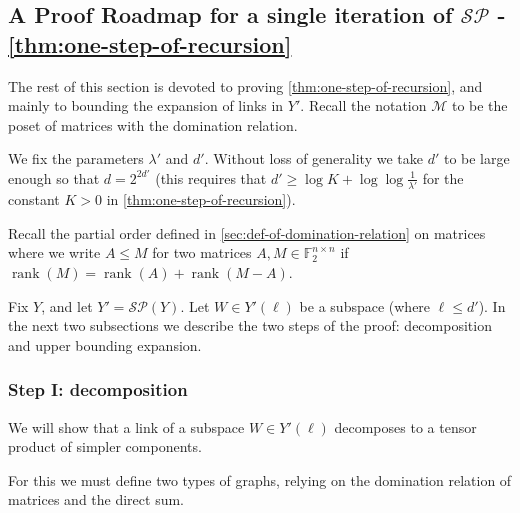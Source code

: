 \documentclass[10pt,a4paper]{article}
\newcommand{\prettyref}[1]{\cref{#1}}
\theoremstyle{definition}
\theoremstyle{remark}
\newcommand{\Authornotecolored}[3]{{\sffamily\small\color{#1}{[#2: #3]}}}
\newcommand{\Authornotecolored}[3]{}
\newcommand{\Ynote}{\Authornotecolored{Purple}{Y}}
\newcommand{\Snote}{\Authornotecolored{Green}{S}}
\newcommand{\snote}{\Snote}
\newcommand{\F}{\mathbb{F}}
\DeclareMathOperator{\rank}{rank}
\renewcommand{\leq}{\leqslant}
\renewcommand{\geq}{\geqslant}
\numberwithin{equation}{section}
\let\pref=\prettyref
\def\Y{Y}
\def\diml{d}
\def\dimlin{{\diml}}
\def\dimlout{\diml'}
\def\lambdao{\lambda'}
\def\dimm{\ell}
\def\M{\mathcal{SP}}
\def\MP{\mathcal{M}}
\begin{document}
\subsection[A Proof roadmap for a single iteration]{A Proof Roadmap for a single iteration of \(\M\) - \pref{thm:one-step-of-recursion}} \label{sec:proof-roadmap}
The rest of this section is devoted to proving \pref{thm:one-step-of-recursion}, and mainly to bounding the expansion of links in \(\Y'\). Recall the notation \(\MP\) to be the poset of matrices with the domination relation.

We fix the parameters \(\lambdao\) and \(\dimlout\). Without loss of generality we take \(\dimlout\) to be large enough so that \(\dimlin = 2^{2\dimlout}\) (this requires that \(\dimlout \geq \log K + \log \log \frac{1}{\lambdao}\) for the constant \(K > 0\) in \pref{thm:one-step-of-recursion}). %

Recall the partial order defined in \pref{sec:def-of-domination-relation} on matrices where we write \(A \leq M\) for two matrices \(A,M \in \F_2^{n \times n}\) if \(\rank(M) = \rank(A) + \rank(M-A)\). 

\medskip

Fix \(\Y\), and let \(\Y' = \M(\Y)\). Let \(W \in \Y'(\dimm)\) be a subspace (where \(\dimm \leq \dimlout\)).  %
In the next two subsections we describe the two steps of the proof: decomposition and upper bounding expansion.
\subsubsection{Step I: decomposition}
We will show that a link of a subspace \(W \in \Y'(\dimm)\) decomposes to a tensor product of simpler components. %

For this we must define two types of graphs, relying on the domination relation of matrices and the direct sum.
\def\under{\mathcal{T}}
\def\disjointgraph{\mathcal{H}}
\end{document}
